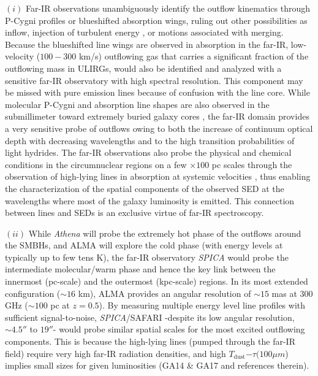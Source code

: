 \documentclass{pasa}%
\newcommand{\tdust}{{\hbox {$T_{\mathrm{dust}}$}}}
\begin{document}
$(i)$ Far-IR observations unambiguously identify the outflow kinematics
through P-Cygni profiles or blueshifted absorption wings, ruling out 
other possibilities as inflow, injection of turbulent energy \citep{gui15},
or motions associated with merging.
Because the blueshifted line wings are observed in absorption
in the far-IR, low-velocity ($100-300$ km/s) outflowing gas that 
carries a significant fraction of the outflowing mass in ULIRGs, would also
be identified and analyzed with a sensitive far-IR observatory with 
high spectral resolution. This
component may be missed with pure emission lines because of confusion
with the line core. While molecular P-Cygni and absorption line shapes are
also observed in the submillimeter toward extremely buried galaxy cores
\citep{sak09,ima16}, the far-IR domain provides a very sensitive probe of
outflows owing to both the increase of continuum optical depth with decreasing
wavelengths and to the high transition probabilities of light hydrides. 
The far-IR observations also probe the physical and chemical conditions in the
circumnuclear regions on a few $\times100$ pc scales through the observation
of high-lying lines in absorption at systemic velocities 
\citep[][GA14, GA15, GA17]{gon12,fal15,fal17},
thus enabling the characterization of the spatial components of the observed
SED at the wavelengths where most of the galaxy luminosity is emitted. This
connection between lines and SEDs is an exclusive virtue of far-IR
spectroscopy. 


$(ii)$ While {\it Athena} will probe the extremely
hot phase of the outflows around the SMBHs, and ALMA will explore the cold
phase (with energy levels at typically up to few tens K), the far-IR
observatory {\it SPICA} would probe the intermediate molecular/warm phase and
hence the key link between the innermost (pc-scale) and the outermost
(kpc-scale) regions. 
In its most extended configuration ($\sim16$ km), ALMA provides an
angular resolution of $\sim15$ mas at 300 GHz ($\sim100$ pc at $z=0.5$). By
measuring multiple energy level line profiles with sufficient signal-to-noise,
{\it SPICA}/SAFARI -despite its low angular resolution, $\sim4.5''$ to $19''$-
would probe similar spatial scales for the most excited outflowing components.
This is because the high-lying lines (pumped through the far-IR field) require
very high far-IR radiation densities, and high \tdust$-\tau(100\mu m$) implies
small sizes for given luminosities  (GA14 \& GA17 and references therein). 
\end{document}
